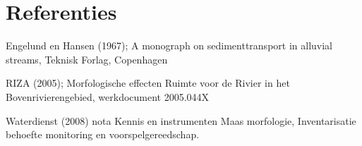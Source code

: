 \chapter*{Referenties}

Engelund en Hansen (1967); A monograph on sedimenttransport in alluvial streams, Teknisk Forlag, Copenhagen

RIZA (2005); Morfologische effecten Ruimte voor de Rivier in het Bovenrivierengebied, werkdocument 2005.044X

Waterdienst (2008) nota Kennis en instrumenten Maas morfologie, Inventarisatie behoefte monitoring en voorspelgereedschap.